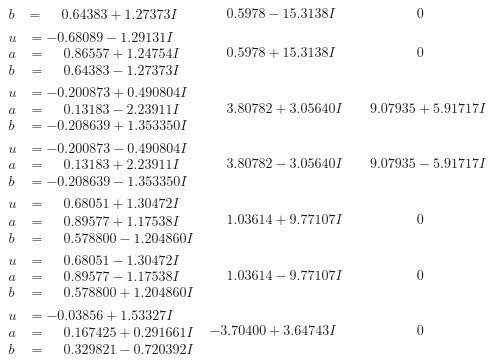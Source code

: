 \documentclass[1p]{elsarticle_modified}
\theoremstyle{definition}
\begin{document}
$$\begin{array}{c|c|c}
\begin{aligned}
b &= \phantom{-}0.64383 + 1.27373 I\end{aligned}
 & \phantom{-}0.5978 - 15.3138 I & \phantom{-0.000000 } 0 \\ \hline\begin{aligned}
u &= -0.68089 - 1.29131 I \\
a &= \phantom{-}0.86557 + 1.24754 I \\
b &= \phantom{-}0.64383 - 1.27373 I\end{aligned}
 & \phantom{-}0.5978 + 15.3138 I & \phantom{-0.000000 } 0 \\ \hline\begin{aligned}
u &= -0.200873 + 0.490804 I \\
a &= \phantom{-}0.13183 - 2.23911 I \\
b &= -0.208639 + 1.353350 I\end{aligned}
 & \phantom{-}3.80782 + 3.05640 I & \phantom{-}9.07935 + 5.91717 I \\ \hline\begin{aligned}
u &= -0.200873 - 0.490804 I \\
a &= \phantom{-}0.13183 + 2.23911 I \\
b &= -0.208639 - 1.353350 I\end{aligned}
 & \phantom{-}3.80782 - 3.05640 I & \phantom{-}9.07935 - 5.91717 I \\ \hline\begin{aligned}
u &= \phantom{-}0.68051 + 1.30472 I \\
a &= \phantom{-}0.89577 + 1.17538 I \\
b &= \phantom{-}0.578800 - 1.204860 I\end{aligned}
 & \phantom{-}1.03614 + 9.77107 I & \phantom{-0.000000 } 0 \\ \hline\begin{aligned}
u &= \phantom{-}0.68051 - 1.30472 I \\
a &= \phantom{-}0.89577 - 1.17538 I \\
b &= \phantom{-}0.578800 + 1.204860 I\end{aligned}
 & \phantom{-}1.03614 - 9.77107 I & \phantom{-0.000000 } 0 \\ \hline\begin{aligned}
u &= -0.03856 + 1.53327 I \\
a &= \phantom{-}0.167425 + 0.291661 I \\
b &= \phantom{-}0.329821 - 0.720392 I\end{aligned}
 & -3.70400 + 3.64743 I & \phantom{-0.000000 } 0 \\ \hline\begin{aligned}

\end{aligned}
\end{array}$$
\end{document}

